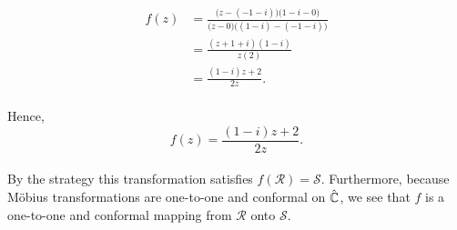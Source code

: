 \begin{enumerate}[label=(\alph*)]
\begin{enumerate}[label=(\roman*)]
        \begin{align*}
            f(z) &= \frac{ \big(z-(-1-i)\big)\big( 1-i-0 \big) }{ \big( z-0 \big) \big( (1-i)-(-1-i) \big) } \\
                 &= \frac{ (z+1+i)(1-i) }{z(2)} \\
                 &= \frac{ (1-i)z + 2}{2z}.
        \end{align*}
        \vs \\
        Hence,
        \[ f(z) = \frac{ (1-i)z + 2}{2z} . \]
        \vs \\
        By the strategy this transformation satisfies $ f(\mathcal{R}) = \mathcal{S}  $. Furthermore, because Möbius transformations are one-to-one and conformal on $ \hat{\mathbb{C}} $, we see that $f$ is a one-to-one and conformal mapping from $ \mathcal{R} $ onto $ \mathcal{S} $.
        
    \end{enumerate}
\end{enumerate}

